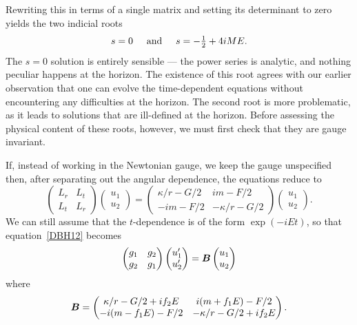 \documentclass[a4paper]{article}
\numberwithin{equation}{section}
\newcommand{\hs}[1]{\hspace*{#1cm}}
\newcommand{\half}{{\textstyle \frac{1}{2}}}
\newcommand{\eqv}{=}
\newcommand{\kap}{\kappa}
\newcommand{\bB}{\mbox{\boldmath $B$}}
\begin{document}
%
Rewriting this in terms of a single matrix and setting its determinant
to zero yields the two indicial roots
%
\begin{equation}
s=0 \hs{0.5} \mbox{and} \hs{0.5} s = -\half + 4iME.
\end{equation} 
%
The $s=0$ solution is entirely sensible --- the power series is
analytic, and nothing peculiar happens at the horizon.  The existence
of this root agrees with our earlier observation that one can evolve
the time-dependent equations without encountering any difficulties at
the horizon.  The second root is more problematic, as it leads to
solutions that are ill-defined at the horizon.  Before assessing the
physical content of these roots, however, we must first check that
they are gauge invariant.

If, instead of working in the Newtonian gauge, we keep the gauge
unspecified then, after separating out the angular dependence, the
equations reduce to
%
\begin{equation}
\begin{pmatrix} L_r & L_t  \\ L_t & L_r \end{pmatrix} 
\begin{pmatrix} u_1 \\ u_2 \end{pmatrix} 
=
\begin{pmatrix} \kap/r-G/2 & im -F/2  \\ -im-F/2 &  -\kap/r-G/2
\end{pmatrix}  
\begin{pmatrix} u_1 \\ u_2 \end{pmatrix} .
\label{DBH12}
\end{equation}
%
We can still assume that the $t$-dependence is of the form
$\exp(-iEt)$, so that equation~\eqref{DBH12} becomes
%
\begin{equation}
\begin{pmatrix} g_1 & g_2  \\ g_2 & g_1 
\end{pmatrix}
\begin{pmatrix} u_1' \\ u_2' \end{pmatrix} 
= \bB
\begin{pmatrix} u_1 \\ u_2 \end{pmatrix}
\label{DBH15}
\end{equation} 
%
where
%
\begin{equation}
\bB \eqv \begin{pmatrix} 
\kap/r-G/2 +if_2 E & i(m+f_1 E) -F/2  \\ -i(m-f_1 E) -F/2 & 
-\kap/r-G/2 +if_2 E \end{pmatrix} . 
\end{equation}
\end{document}
